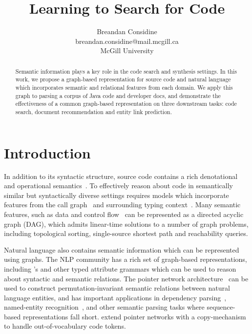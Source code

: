\documentclass{article}
\title{Learning to Search for Code}
\author{Breandan Considine\\
breandan.considine@mail.mcgill.ca\\
McGill University}
\begin{document}
\maketitle

\begin{abstract}
Semantic information plays a key role in the code search and synthesis settings. In this work, we propose a graph-based representation for source code and natural language which incorporates semantic and relational features from each domain. We apply this graph to parsing a corpus of Java code and developer docs, and demonstrate the effectiveness of a common graph-based representation on three downstream tasks: code search, document recommendation and entity link prediction.
\end{abstract}

\section{Introduction}

In addition to its syntactic structure, source code contains a rich denotational and operational semantics~\citep{henkel2018code}. To effectively reason about code in semantically similar but syntactically diverse settings requires models which incorporate features from the call graph~\citep{gu2016deep, liu2019neural} and surrounding typing context~\citep{allamanis2017learning}. Many semantic features, such as data and control flow~\citep{si2018learning} can be represented as a directed acyclic graph (DAG), which admits linear-time solutions to a number of graph problems, including topological sorting, single-source shortest path and reachability queries.

Natural language also contains semantic information which can be represented using graphs. The NLP community has a rich set of graph-based representations, including \citet{reddy2016transforming}'s and other typed attribute grammars which can be used to reason about syntactic and semantic relations. The pointer network architecture~\citep{vinyals2015pointer, vinyals2015order} can be used to construct permutation-invariant semantic relations between natural language entities, and has important applications in dependency parsing~\citep{ma2018stack}, named-entity recognition~\citep{lample2016neural}, and other semantic parsing tasks where sequence-based representations fall short. \citet{li2017code} extend pointer networks with a copy-mechanism to handle out-of-vocabulary code tokens.
\end{document}
